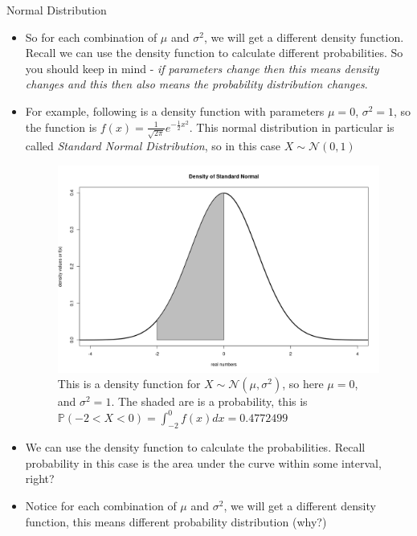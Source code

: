\documentclass[8pt, usepdftitle = false]{beamer}
\begin{document}
\begin{frame}[allowframebreaks]{Normal Distribution}
\begin{itemize}
\item So for each combination of $\mu$ and $\sigma^2$, we will get a different density function. Recall we can use the density function to calculate different probabilities. So you should keep in mind - \emph{if parameters change then this means density changes and this then also means the probability distribution changes}.

\framebreak


\item For example, following is a density function with parameters $\mu = 0$, $\sigma^2 =1$, so the function is   $f(x) = \frac{1}{\sqrt{2 \pi}} e^{-\frac{1}{2}x^2}$. This normal distribution in particular is called \emph{Standard Normal Distribution}, so in this case $X \sim \mathcal{N}(0, 1)$

 

\begin{figure}
\centering
\includegraphics[scale = .25]{Images/Normal_density_area.png}
\caption{This is a density function for $X \sim \mathcal{N}(\mu, \sigma^2)$, so here $\mu = 0$, and $\sigma^2 = 1$. The shaded are is a probability, this is $\mathbb{P}(-2 < X < 0 )=\int_{-2}^0 f(x) d x=0.4772499$}
\end{figure}


\item We can use the density function to calculate the probabilities. Recall probability in this case is the area under the curve within some interval, right?

\item Notice for each combination of $\mu$ and $\sigma^2$, we will get a different density function, this means different probability distribution (why?)



\end{itemize}
\end{frame}
\end{document}
